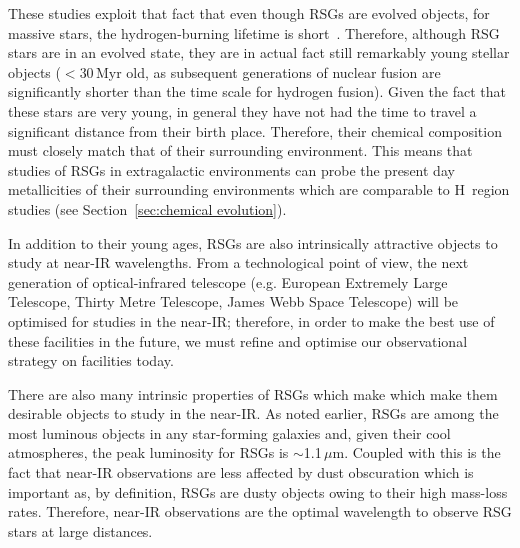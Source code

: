 These studies exploit that fact that even though RSGs are evolved objects, for massive stars, the hydrogen-burning lifetime is short~\citep[just over 25\,Myr for a 8\,M$_{\odot}$ star and consequently shorter for higher-mass stars][]{2012A&A...537A.146E}.
Therefore, although RSG stars are in an evolved state, they are in actual fact still remarkably young stellar objects ($<$30\,Myr old, as subsequent generations of nuclear fusion are significantly shorter than the time scale for hydrogen fusion).
Given the fact that these stars are very young, in general they have not had the time to travel a significant distance from their birth place.
Therefore, their chemical composition must closely match that of their surrounding environment.
This means that studies of RSGs in extragalactic environments can probe the present day metallicities of their surrounding environments which are comparable to H\,\2 region studies (see Section~\ref{sec:chemical evolution}).

In addition to their young ages, RSGs are also intrinsically attractive objects to study at near-IR wavelengths.
From a technological point of view, the next generation of optical-infrared telescope (e.g. European Extremely Large Telescope, Thirty Metre Telescope, James Webb Space Telescope) will be optimised for studies in the near-IR; therefore, in order to make the best use of these facilities in the future, we must refine and optimise our observational strategy on facilities today.

There are also many intrinsic properties of RSGs which make  which make them desirable objects to study in the near-IR.
As noted earlier, RSGs are among the most luminous objects in any star-forming galaxies and, given their cool atmospheres, the peak luminosity for RSGs is $\sim$1.1\,$\mu$m.
Coupled with this is the fact that near-IR observations are less affected by dust obscuration which is important as, by definition, RSGs are dusty objects owing to their high mass-loss rates.
Therefore, near-IR observations are the optimal wavelength to observe RSG stars at large distances.

